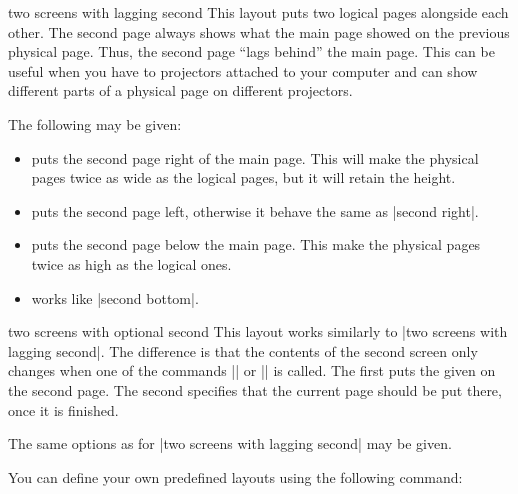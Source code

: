 \begin{pgflayout}{two screens with lagging second}
  This layout puts two logical pages alongside each other. The second
  page always shows what the main
  page showed on the previous physical page. Thus, the second page
  ``lags behind'' the main page. This can be useful when you have to
  projectors attached to your computer and can show different parts of
  a physical page on different projectors.

  The following  may be given:
  \begin{itemize}
  \item {} puts the second page right of the
    main page. This will make the physical pages twice as wide
    as the logical pages, but it will retain the height.
  \item {} puts the second page left,
    otherwise it behave the same as |second right|.
  \item {} puts the second page below the main
    page. This make the physical pages twice as high as the logical
    ones.
  \item {} works like |second bottom|.
  \end{itemize}
\end{pgflayout}

\begin{pgflayout}{two screens with optional second}
  This layout works similarly to
  |two screens with lagging second|. The difference is that the
  contents of the second screen only changes when one of the commands
  || or
  || is called. The first puts the
  given  on the second page. The second specifies that the
  current page should be put there, once it is finished.

  The same options as for |two screens with lagging second| may be
  given.
\end{pgflayout}



You can define your own predefined layouts using the following
command:

